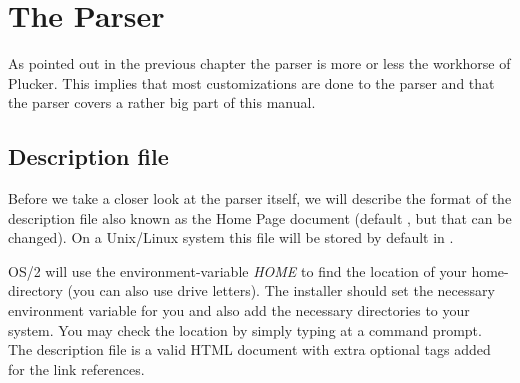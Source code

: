 %
%
\chapter{The Parser}\label{sec:Parser}

As pointed out in the previous chapter the parser is more or less the
workhorse of Plucker. This implies that most customizations are done to
the parser and that the parser covers a rather big part of this manual.

\section{Description file}\label{sec:Home Page}

Before we take a closer look at the parser itself, we will describe
the format of the description file also known as the Home Page document
(default , but that can be changed). On a Unix/Linux
system this file will be stored by default in .

OS/2 will use the environment-variable \textit{HOME} to find the
location of your home-directory (you can also use drive letters).
The installer should set the necessary environment variable for
you and also add the necessary directories to your system. You
may check the location by simply typing  at a
command prompt.\\

The description file is a valid HTML document with extra optional
tags added for the link references.

